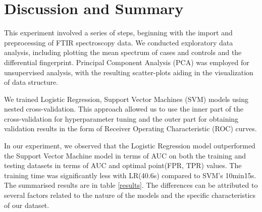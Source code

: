 \documentclass{cernatsnote}
\begin{document}
\vspace{100cm}
\section{Discussion and Summary}

This experiment involved a series of steps, beginning with the import and preprocessing of FTIR spectroscopy data. We conducted exploratory data analysis, including plotting the mean spectrum of cases and controls and the differential fingerprint. Principal Component Analysis (PCA) was employed for unsupervised analysis, with the resulting scatter-plots aiding in the visualization of data structure. 

We trained Logistic Regression, Support Vector Machines (SVM) models using nested cross-validation. This approach allowed us to use the inner part of the cross-validation for hyperparameter tuning and the outer part for obtaining validation results in the form of Receiver Operating Characteristic (ROC) curves.

In our experiment, we observed that the Logistic Regression model outperformed the Support Vector Machine model in terms of AUC on both the training and testing datasets in terms of AUC and optimal point(FPR, TPR) values. The training time was significantly less with LR(40.6s) compared to SVM's 10min15s. The summarised results are in table \ref{results}. The differences can be attributed to several factors related to the nature of the models and the specific characteristics of our dataset.
\end{document}
